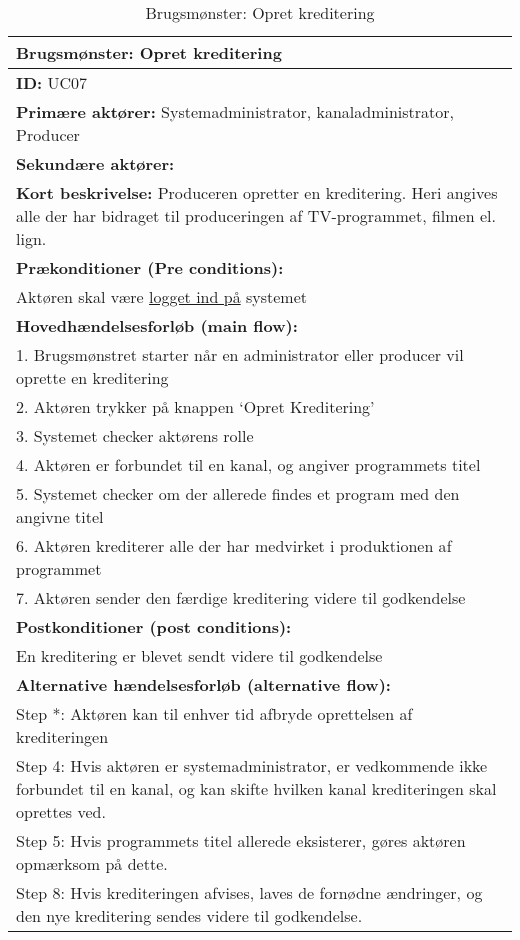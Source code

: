 \begin{table}[ht]
    \begin{tabularx}{\textwidth}{|X|}
            \hline
            \textbf{Brugsmønster:} Opret kreditering \\
            \hline
        	\textbf{ID:} UC07 \\ \hline
        	\textbf{Primære aktører:} Systemadministrator, kanaladministrator, Producer \\ \hline
        	\textbf{Sekundære aktører:} \\ \hline
        	\textbf{Kort beskrivelse:} Produceren opretter en kreditering. Heri angives alle der har bidraget til produceringen af TV-programmet, filmen el. lign. \\ \hline
        	\textbf{Prækonditioner (Pre conditions):} \\
        Aktøren skal være \hyperref[table:login]{logget ind på} systemet \\ \hline
        \textbf{Hovedhændelsesforløb (main flow):} \\
        	1. Brugsmønstret starter når en administrator eller producer vil oprette en kreditering \\
        	2. Aktøren trykker på knappen ‘Opret Kreditering’ \\
        	3. Systemet checker aktørens rolle \\
        	4. Aktøren er forbundet til en kanal, og angiver programmets titel \\
        	5. Systemet checker om der allerede findes et program med den angivne titel \\ 
        	6. Aktøren krediterer alle der har medvirket i produktionen af programmet \\ 
        	7. Aktøren sender den færdige kreditering videre til godkendelse \\ \hline
        \textbf{Postkonditioner (post conditions):} \\ 
        	En kreditering er blevet sendt videre til godkendelse \\ \hline
        	\textbf{Alternative hændelsesforløb (alternative flow):} \\
        Step *: Aktøren kan til enhver tid afbryde oprettelsen af krediteringen \\
        Step 4: Hvis aktøren er systemadministrator, er vedkommende ikke forbundet til en kanal, og kan skifte hvilken kanal krediteringen skal oprettes ved. \\
        
        Step 5: Hvis programmets titel allerede eksisterer, gøres aktøren opmærksom på dette. \\
        
        Step 8: Hvis krediteringen afvises, laves de fornødne ændringer, og den nye kreditering sendes videre til godkendelse. \\
        \hline
    \end{tabularx}
    \caption{Brugsmønster: Opret kreditering}
    \label{tab:create_credits}
\end{table}

